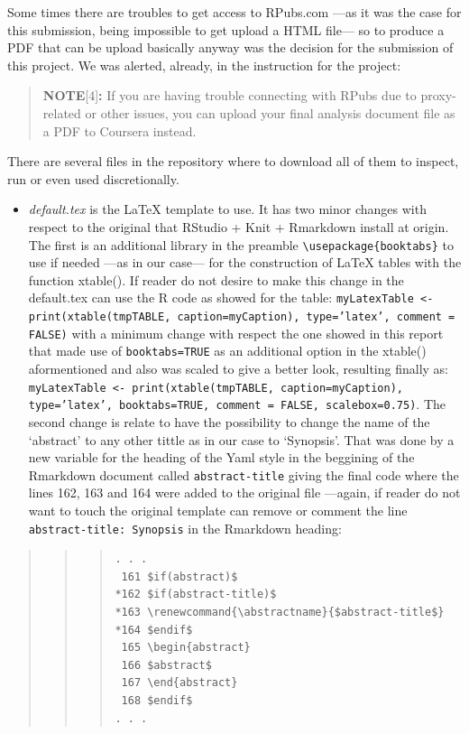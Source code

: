 \documentclass[12pt,spanish, american,b4paper, onecolumn, lmargin=1cm, rmargin=1cm, tmargin=1cm, bmargin=2cm,]{article}
\begin{document}
Some times there are troubles to get access to RPubs.com ---as it was
the case for this submission, being impossible to get upload a HTML
file--- so to produce a PDF that can be upload basically anyway was the
decision for the submission of this project. We was alerted, already, in
the instruction for the project:

\begin{quote}
\textbf{NOTE}{[}4{]}\textbf{:} If you are having trouble connecting with
RPubs due to proxy-related or other issues, you can upload your final
analysis document file as a PDF to Coursera instead.
\end{quote}

There are several files in the repository where to download all of them
to inspect, run or even used discretionally.

\begin{itemize}
\itemsep1pt\parskip0pt
\item
  \emph{default.tex} is the LaTeX template to use. It has two minor
  changes with respect to the original that RStudio + Knit + Rmarkdown
  install at origin. The first is an additional library in the preamble
  \texttt{\textbackslash{}usepackage\{booktabs\}} to use if needed ---as
  in our case--- for the construction of LaTeX tables with the function
  xtable(). If reader do not desire to make this change in the
  default.tex can use the R code as showed for the table:
  \texttt{myLatexTable \textless{}- print(xtable(tmpTABLE, caption=myCaption), type='latex', comment = FALSE)}
  with a minimum change with respect the one showed in this report that
  made use of \texttt{booktabs=TRUE} as an additional option in the
  xtable() aformentioned and also was scaled to give a better look,
  resulting finally as:
  \texttt{myLatexTable \textless{}- print(xtable(tmpTABLE, caption=myCaption), type='latex', booktabs=TRUE, comment = FALSE, scalebox=0.75)}.
  The second change is relate to have the possibility to change the name
  of the `abstract' to any other tittle as in our case to `Synopsis'.
  That was done by a new variable for the heading of the Yaml style in
  the beggining of the Rmarkdown document called \texttt{abstract-title}
  giving the final code where the lines 162, 163 and 164 were added to
  the original file ---again, if reader do not want to touch the
  original template can remove or comment the line
  \texttt{abstract-title: Synopsis} in the Rmarkdown heading:
\end{itemize}

\begin{quote}
\begin{quote}
\begin{quote}
\begin{verbatim}
. . .
 161 $if(abstract)$
*162 $if(abstract-title)$
*163 \renewcommand{\abstractname}{$abstract-title$}
*164 $endif$
 165 \begin{abstract}
 166 $abstract$
 167 \end{abstract}
 168 $endif$
. . . 
\end{verbatim}
\end{quote}
\end{quote}
\end{quote}
\end{document}
